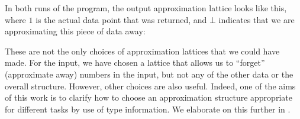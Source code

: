 \begin{example}
\begin{center}
  \end{center}
  In both runs of the program, the output approximation lattice looks like this, where $1$ is the actual data point that was returned, and $\bot$ indicates that we are approximating this piece of data away:
  \begin{center}
  \end{center}
  These are not the only choices of approximation lattices that we could have made. For the input, we have chosen a lattice that allows us to ``forget'' (approximate away) numbers in the input, but not any of the other data or the overall structure. However, other choices are also useful. Indeed, one of the aims of this work is to clarify how to choose an approximation structure appropriate for different tasks by use of type information. We elaborate on this further in .


\end{example}
